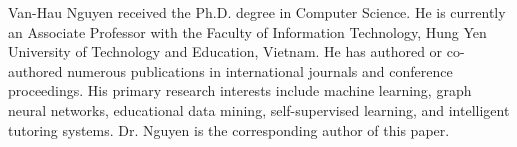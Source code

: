 ﻿\documentclass[10pt,journal,compsoc]{IEEEtran}
\begin{document}
\begin{IEEEbiographynophoto}{Van-Hau Nguyen}
received the Ph.D. degree in Computer Science. He is currently an Associate Professor with the Faculty of Information Technology, Hung Yen University of Technology and Education, Vietnam. He has authored or co-authored numerous publications in international journals and conference proceedings. His primary research interests include machine learning, graph neural networks, educational data mining, self-supervised learning, and intelligent tutoring systems. Dr. Nguyen is the corresponding author of this paper.
\end{IEEEbiographynophoto}
\end{document}
